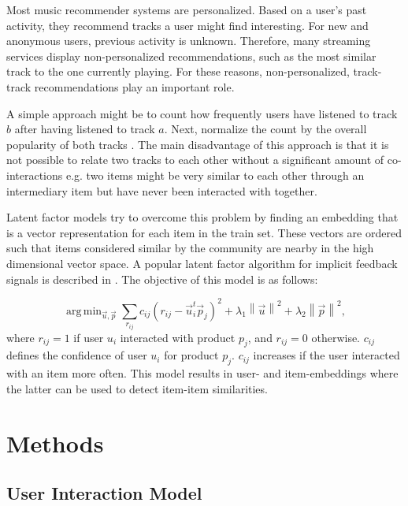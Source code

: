 \documentclass[twocolumn]{article}
\newcommand{\norm}[1]{\left\lVert#1\right\rVert}
\DeclareMathOperator*{\argmin}{arg\,min}
\begin{document}
Most music recommender systems are personalized. Based on a user's past activity, they recommend tracks a user might find interesting. For new and anonymous users, previous activity is unknown. Therefore, many streaming services display non-personalized recommendations, such as the most similar track to the one currently playing. For these reasons, non-personalized, track-track recommendations play an important role.

A simple approach might be to count how frequently users have listened to track $b$ after having listened to track $a$. Next, normalize the count by the overall popularity of both tracks \cite{Davidson:2010:YVR:1864708.1864770, Spertus:2005:ESM:1081870.1081956}.
The main disadvantage of this approach is that it is not possible to relate two tracks to each other without a significant amount of co-interactions e.g. two items might be very similar to each other through an intermediary item but have never been interacted with together.

Latent factor models try to overcome this problem by finding an embedding that is a vector representation for each item in the train set. These vectors are ordered such that items considered similar by the community are nearby in the high dimensional vector space. A popular latent factor algorithm for implicit feedback signals is described in \cite{implicit-factorization}. The objective of this model is as follows:

\begin{equation}
 \argmin_{\vec{u}, \vec{p}} \sum_{r_{ij}} c_{ij}(r_{ij} - \vec{u}_i^t \vec{p}_j)^2 + \lambda_1 \norm{\vec{u}}^2 + \lambda_2  \norm{\vec{p}}^2,
\end{equation}
where $r_{ij} = 1$ if user $u_i$ interacted with product $p_j$, and $r_{ij} = 0$ otherwise. $c_{ij}$ defines the confidence of user $u_i$ for product $p_j$. $c_{ij}$ increases if the user interacted with an item more often. This model results in user- and item-embeddings where the latter can be used to detect item-item similarities.

\section{Methods}

\subsection{User Interaction Model} \label{user-interaction-model}
\end{document}
